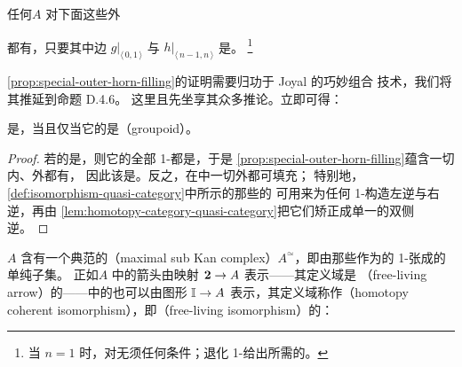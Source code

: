 \begin{proposition}\label{prop:special-outer-horn-filling}
任何\trQuasiCategory $A$ 对下面这些外\trHorn
\begin{center}
\end{center}
都有\trFiller{}，只要其中边 $g|_{\langle\,0,1\,\rangle}$ 与 $h|_{\langle\,n-1,n\,\rangle}$ 是\trIsomorphism{}。
\footnote{当 $n=1$ 时，对\trHorn{}无须任何条件；退化 1-\trSimplex{}给出所需的\trLifting{}。}
\end{proposition}

\cref{prop:special-outer-horn-filling}的证明需要归功于 Joyal 的巧妙组合
技术，我们将其推延到命题 D.4.6。%
这里且先坐享其众多推论。立即可得：

\begin{corollary}\label{cor:kan-groupoid}
\trQuasiCategory{}是\trKanComplex{}，当且仅当它的\trHomotopyCategory{}是\trGroupoid{}（groupoid）。
\end{corollary}
\begin{proof}
若\trQuasiCategory{}的\trHomotopyCategory{}是\trGroupoid{}，则它的全部 1-\trSimplex{}都是\trIsomorphism{}，于是
\cref{prop:special-outer-horn-filling}蕴含一切内、外\trHorn{}都有\trFiller{}，
因此该\trQuasiCategory{}是\trKanComplex{}。反之，在\trKanComplex{}中一切外\trHorn{}都可填充；
特别地，\cref{def:isomorphism-quasi-category}中所示的那些\trHorn{}的\trFiller
可用来为任何 1-\trSimplex{}构造左逆与右逆，再由
\cref{lem:homotopy-category-quasi-category}把它们矫正成单一的双侧逆。
\end{proof}

\trQuasiCategory $A$ 含有一个典范的\textbf{\trMaximalSubKanComplex}（maximal sub Kan
complex）$A^{\simeq}$，即由那些作为\trIsomorphism{}的 1-\trSimplex{}张成的单纯子集。
正如\trQuasiCategory $A$ 中的箭头由\trSimplicialSet{}映射 $\mathbf{2}\to A$ 表示——其定义域是
\emph{\trFreeLivingArrow}（free-living arrow）的\trNerve——\trQuasiCategory{}中的\trIsomorphism{}也可以由图形
$\mathbb{I}\to A$ 表示，其定义域称作\textbf{\trHomotopyCoherentIsomorphism}（homotopy
coherent isomorphism），即\emph{\trFreeLivingIsomorphism}（free-living isomorphism）的\trNerve{}：

